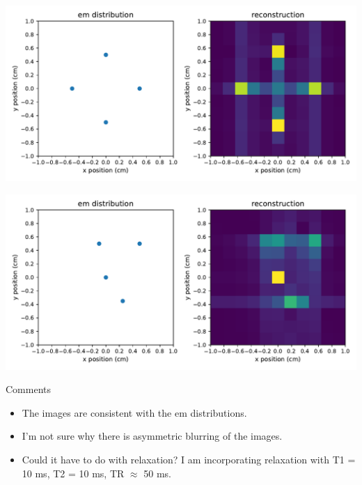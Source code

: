 \documentclass[dvipsnames]{beamer}
\begin{document}
\begin{frame}
\begin{center}
\includegraphics[width=\textwidth]{reconstruction_ems-star}
\end{center}
\end{frame}

\begin{frame}
\begin{center}
\includegraphics[width=\textwidth]{reconstruction_ems-scattered}
\end{center}
\end{frame}

\begin{frame}{Comments}
\begin{itemize}
\item The images are consistent with the em distributions.
\item I'm not sure why there is asymmetric blurring of the images.
\item Could it have to do with relaxation? I am incorporating relaxation with T1 = 10 ms, T2 = 10 ms, TR $\approx$ 50 ms.
\end{itemize}
\end{frame}
\end{document}

